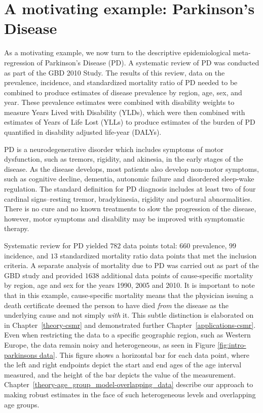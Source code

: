 \section{A motivating example: Parkinson's Disease}
\label{intro-complete_ex}

As a motivating example, we now turn to the descriptive
epidemiological meta-regression of Parkinson's Disease (PD). A
systematic review of PD was conducted as part of the GBD 2010
Study.\cite{GBD_2010_or_parkinsons_paper} The results of this review,
data on the prevalence, incidence, and standardized mortality ratio of PD
needed to be combined to produce estimates of disease prevalence by
region, age, sex, and year.  These prevalence estimates were combined
with disability weights to measure Years Lived with Disability (YLDs),
which were then combined with estimates of Years of Life Lost (YLLs)
to produce estimates of the burden of PD quantified in disability
adjusted life-year (DALYs).

PD is a neurodegenerative disorder which includes symptoms of motor
dysfunction, such as tremors, rigidity, and akinesia, in the early
stages of the disease.  As the disease develops, most patients also
develop non-motor symptoms, such as cognitive decline, dementia,
autonomic failure and disordered sleep-wake regulation.  The standard
definition for PD diagnosis includes at least two of four cardinal
signs--resting tremor, bradykinesia, rigidity and postural abnormalities.
There is no cure and no known treatments to slow the progression of the disease,
however, motor symptoms and disability may be improved with
symptomatic therapy.\cite{poewe_natural_2006, pollock_prevalence_1966, larsen_clinical_1994}

Systematic review for PD yielded $782$ data points total: $660$
prevalence, $99$ incidence, and $13$ standardized mortality ratio data
points that met the inclusion criteria.  A separate analysis of
mortality due to PD was carried out as part of the GBD study and
provided $1638$ additional data points of cause-specific mortality by
region, age and sex for the years 1990, 2005 and 2010.  It is
important to note that in this example, cause-specific mortality means
that the physician issuing a death certificate deemed the person to
have died \emph{from} the disease as the underlying cause and not
simply \emph{with} it.  This subtle distinction is elaborated on in
Chapter~\ref{theory-csmr} and demonstrated further
Chapter~\ref{applications-csmr}.  Even when restricting the data to a
specific geographic region, such as Western Europe, the data remain
noisy and heterogeneous, as seen in Figure \ref{fig:intro-parkinsons
  data}. This figure shows a horizontal bar for each data point, where
the left and right endpoints depict the start and end ages of the age
interval measured, and the height of the bar depicts the value of the
measurement. Chapter~\ref{theory-age_group_model-overlapping_data}
describe our approach to making
robust estimates in the face of such heterogeneous levels and
overlapping age groups.

